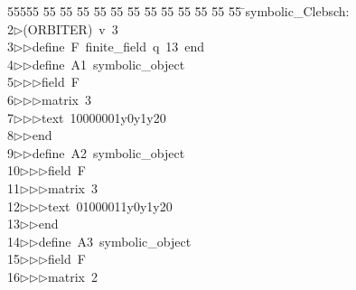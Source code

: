 %
%
\begin{tabbing}
55555 \= 55 \= 55 \= 55 \= 55 \= 55 \= 55 \= 55 \= 55 \= 55 \= 55 \= 55 \= 55 \= \>symbolic\_Clebsch:\\[0pt]
2\>$\triangleright$\>(ORBITER)\ v\ 3\ \\[0pt]
3\>$\triangleright$\>$\triangleright$\>define\ F\ finite\_field\ q\ 13\ end\ \\[0pt]
4\>$\triangleright$\>$\triangleright$\>define\ A1\ symbolic\_object\ \\[0pt]
5\>$\triangleright$\>$\triangleright$\>$\triangleright$\>field\ F\ \\[0pt]
6\>$\triangleright$\>$\triangleright$\>$\triangleright$\>matrix\ 3\ \\[0pt]
7\>$\triangleright$\>$\triangleright$\>$\triangleright$\>text\ 10000001y0y1y20\ \\[0pt]
8\>$\triangleright$\>$\triangleright$\>end\ \\[0pt]
9\>$\triangleright$\>$\triangleright$\>define\ A2\ symbolic\_object\ \\[0pt]
10\>$\triangleright$\>$\triangleright$\>$\triangleright$\>field\ F\ \\[0pt]
11\>$\triangleright$\>$\triangleright$\>$\triangleright$\>matrix\ 3\ \\[0pt]
12\>$\triangleright$\>$\triangleright$\>$\triangleright$\>text\ 01000011y0y1y20\ \\[0pt]
13\>$\triangleright$\>$\triangleright$\>end\ \\[0pt]
14\>$\triangleright$\>$\triangleright$\>define\ A3\ symbolic\_object\ \\[0pt]
15\>$\triangleright$\>$\triangleright$\>$\triangleright$\>field\ F\ \\[0pt]
16\>$\triangleright$\>$\triangleright$\>$\triangleright$\>matrix\ 2\ \\[0pt]

\end{tabbing}
